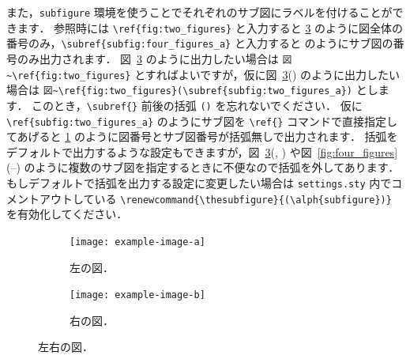 また，\verb|subfigure| 環境を使うことでそれぞれのサブ図にラベルを付けることができます．
参照時には \verb|\ref{fig:two_figures}| と入力すると \ref{fig:two_figures} のように図全体の番号のみ，\verb|\subref{subfig:four_figures_a}| と入力すると  のようにサブ図の番号のみ出力されます．
図~\ref{fig:two_figures} のように出力したい場合は \verb|図~\ref{fig:two_figures}| とすればよいですが，仮に図~\ref{fig:two_figures}() のように出力したい場合は \verb|図~\ref{fig:two_figures}(\subref{subfig:two_figures_a})| とします．
このとき，\verb|\subref{}| 前後の括弧 \verb|()| を忘れないでください．
仮に \verb|\ref{subfig:two_figures_a}| のようにサブ図を \verb|\ref{}| コマンドで直接指定してあげると \ref{subfig:two_figures_a} のように図番号とサブ図番号が括弧無しで出力されます．
括弧をデフォルトで出力するような設定もできますが，図~\ref{fig:two_figures}(, ) や図~\ref{fig:four_figures}(--) のように複数のサブ図を指定するときに不便なので括弧を外してあります．
もしデフォルトで括弧を出力する設定に変更したい場合は \verb|settings.sty| 内でコメントアウトしている \verb|\renewcommand{\thesubfigure}{(\alph{subfigure})}| を有効化してください．




\begin{figure}[tp]
    \centering
    \begin{subfigure}{0.45\columnwidth}
        \centering
        \texttt{[image: example-image-a]}
        \caption{左の図．}
        \label{subfig:two_figures_a}
    \end{subfigure}
    \hfill %
    \begin{subfigure}{0.45\columnwidth}
        \centering
        \texttt{[image: example-image-b]}
        \caption{右の図．}
        \label{subfig:two_figures_b}
    \end{subfigure}
    \caption{左右の図．}
    \label{fig:two_figures}
\end{figure}

